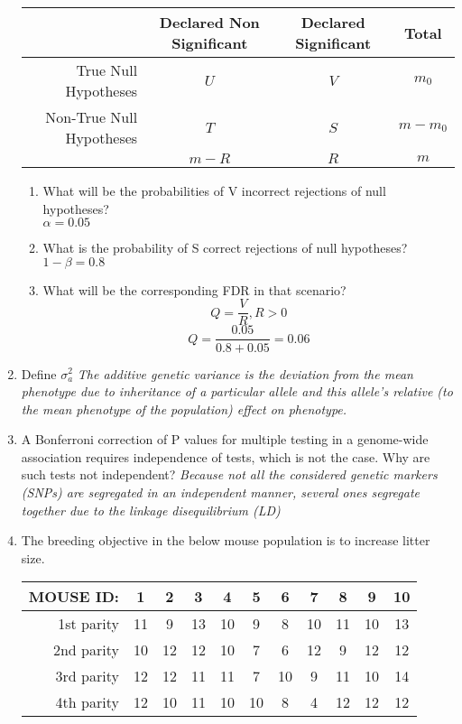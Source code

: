 \documentclass[12pt,a4paper]{paper}
\begin{document}
\begin{enumerate}
\begin{center}
\begin{tabular}{|r|c|c|c|}
\hline
&Declared Non Significant&Declared Significant&Total\\
\hline
True Null Hypotheses&$U$&$V$&$m_{0}$\\
\hline
Non-True Null Hypotheses&$T$&$S$&$m - m_{0}$\\
\hline
&$m - R$&$R$&$m$\\
\hline
\end{tabular}
\end{center}
\begin{enumerate}
\item What will be the probabilities of V incorrect rejections of null hypotheses?\\ \textit{$\alpha = 0.05$}
\item What is the probability of S correct rejections of null hypotheses?\\ \textit{$1-\beta = 0.8$}
\item What will be the corresponding FDR in that scenario? \[Q = \frac{V}{R}, R > 0\]\[Q = \frac{0.05}{0.8 + 0.05} = 0.06\]
\end{enumerate}
\item Define $\sigma^{2}_{a}$ \textit{The additive genetic variance is the deviation from the mean phenotype due to inheritance of a particular allele and this allele's relative (to the mean phenotype of the population) effect on phenotype.}
\item A Bonferroni correction of P values for multiple testing in a genome-wide association requires independence of tests, which is not the case.  Why are such tests not independent? \textit{Because not all the considered genetic markers (SNPs) are segregated in an independent manner, several ones segregate together due to the linkage disequilibrium (LD)}
\item The breeding objective in the below mouse population is to increase litter size. 
\begin{center}
\begin{tabular}{|r||c|c|c|c|c|c|c|c|c|c|}
\hline
MOUSE ID:&1&2&3&4&5&6&7&8&9&10\\
\hline
\hline
1st parity&11&9&13&10&9&8&10&11&10&13\\
\hline
2nd parity&10&12&12&10&7&6&12&9&12&12\\
\hline
3rd parity&12&12&11&11&7&10&9&11&10&14\\
\hline
4th parity&12&10&11&10&10&8&4&12&12&12\\

\end{tabular}
\end{center}
\end{enumerate}
\end{document}
